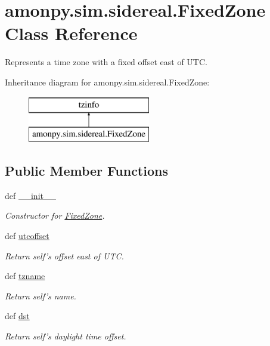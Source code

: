 \hypertarget{classamonpy_1_1sim_1_1sidereal_1_1_fixed_zone}{\section{amonpy.\-sim.\-sidereal.\-Fixed\-Zone Class Reference}
\label{classamonpy_1_1sim_1_1sidereal_1_1_fixed_zone}
}


Represents a time zone with a fixed offset east of U\-T\-C.  


Inheritance diagram for amonpy.\-sim.\-sidereal.\-Fixed\-Zone\-:\begin{figure}[H]
\begin{center}
\leavevmode
\includegraphics[height=2.000000cm]{d0/d58/classamonpy_1_1sim_1_1sidereal_1_1_fixed_zone}
\end{center}
\end{figure}
\subsection*{Public Member Functions}
\begin{DoxyCompactItemize}
\item 
def \hyperlink{classamonpy_1_1sim_1_1sidereal_1_1_fixed_zone_a4b1001f54b5a79fd3d4e36d22d6b1773}{\-\_\-\-\_\-init\-\_\-\-\_\-}
\begin{DoxyCompactList}\small\item\em Constructor for \hyperlink{classamonpy_1_1sim_1_1sidereal_1_1_fixed_zone}{Fixed\-Zone}. \end{DoxyCompactList}\item 
def \hyperlink{classamonpy_1_1sim_1_1sidereal_1_1_fixed_zone_a259dc7d17941495116721e9ad5aa75a5}{utcoffset}
\begin{DoxyCompactList}\small\item\em Return self's offset east of U\-T\-C. \end{DoxyCompactList}\item 
def \hyperlink{classamonpy_1_1sim_1_1sidereal_1_1_fixed_zone_a71498be1686ee252280e0aab5585c56b}{tzname}
\begin{DoxyCompactList}\small\item\em Return self's name. \end{DoxyCompactList}\item 
def \hyperlink{classamonpy_1_1sim_1_1sidereal_1_1_fixed_zone_a5a37ebf256e2dc3233aaf05c19a2f84d}{dst}
\begin{DoxyCompactList}\small\item\em Return self's daylight time offset. \end{DoxyCompactList}\end{DoxyCompactItemize}


